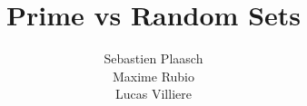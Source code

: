 \documentclass{article}
\begin{document}
\author{Sebastien Plaasch \\ Maxime Rubio  \\ Lucas Villiere}
\title{Prime vs Random Sets}
\maketitle
\tableofcontents
\end{document}
